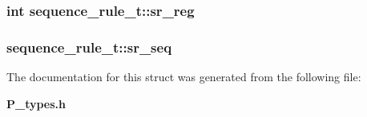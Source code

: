 \subsubsection{\setlength{\rightskip}{0pt plus 5cm}int sequence\_\-rule\_\-t::sr\_\-reg}\label{structsequence__rule__t_m2}


\subsubsection{ sequence\_\-rule\_\-t::sr\_\-seq}\label{structsequence__rule__t_m0}




The documentation for this struct was generated from the following file:\begin{CompactItemize}
\item 
{\bf P\_\-types.h}\end{CompactItemize}
